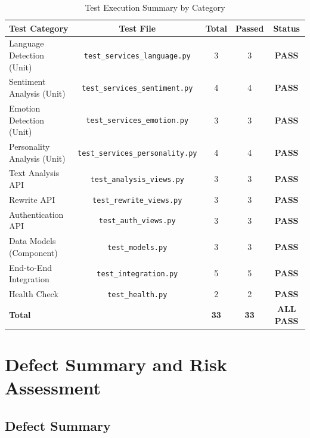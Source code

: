 \documentclass[12pt,a4paper]{report}
\begin{document}
\begin{itemize}
\begin{table}[H]
\centering
\caption{Test Execution Summary by Category}
\label{tab:test_exec_summary}
\begin{tabularx}{\textwidth}{|X|c|c|c|c|}
\hline
\textbf{Test Category} & \textbf{Test File} & \textbf{Total} & \textbf{Passed} & \textbf{Status} \\
\hline
Language Detection (Unit) & \texttt{test\_services\_language.py} & 3 & 3 & \textcolor{green!60!black}{\textbf{PASS}} \\
\hline
Sentiment Analysis (Unit) & \texttt{test\_services\_sentiment.py} & 4 & 4 & \textcolor{green!60!black}{\textbf{PASS}} \\
\hline
Emotion Detection (Unit) & \texttt{test\_services\_emotion.py} & 3 & 3 & \textcolor{green!60!black}{\textbf{PASS}} \\
\hline
Personality Analysis (Unit) & \texttt{test\_services\_personality.py} & 4 & 4 & \textcolor{green!60!black}{\textbf{PASS}} \\
\hline
Text Analysis API & \texttt{test\_analysis\_views.py} & 3 & 3 & \textcolor{green!60!black}{\textbf{PASS}} \\
\hline
Rewrite API & \texttt{test\_rewrite\_views.py} & 3 & 3 & \textcolor{green!60!black}{\textbf{PASS}} \\
\hline
Authentication API & \texttt{test\_auth\_views.py} & 3 & 3 & \textcolor{green!60!black}{\textbf{PASS}} \\
\hline
Data Models (Component) & \texttt{test\_models.py} & 3 & 3 & \textcolor{green!60!black}{\textbf{PASS}} \\
\hline
End-to-End Integration & \texttt{test\_integration.py} & 5 & 5 & \textcolor{green!60!black}{\textbf{PASS}} \\
\hline
Health Check & \texttt{test\_health.py} & 2 & 2 & \textcolor{green!60!black}{\textbf{PASS}} \\
\hline
\textbf{Total} & & \textbf{33} & \textbf{33} & \textcolor{green!60!black}{\textbf{ALL PASS}} \\
\hline
\end{tabularx}
\end{table}

\section{Defect Summary and Risk Assessment}

\subsection{Defect Summary}


\end{itemize}
\end{document}
